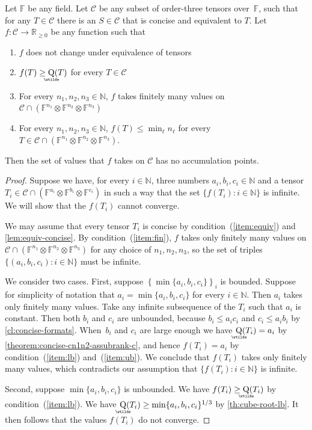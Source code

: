 \documentclass{daj}
\DeclareMathOperator{\asympsubrank}{\underaccent{\wtilde}{Q}}
\newcommand{\FF}{\mathbb{F}}
\newcommand{\RR}{\mathbb{R}}
\newcommand{\NN}{\mathbb{N}}
\begin{document}
\begin{theorem}
    \label{th:gen-no-acc}
    Let $\FF$ be any field. Let $\mathcal{C}$ be any subset of order-three tensors over~$\FF$, such that for any $T \in \mathcal{C}$ there is an $S \in \mathcal{C}$ that is concise and equivalent to $T$.
    Let~$f : \mathcal{C} \to \RR_{\geq0}$ be any function such that
    \begin{enumerate}[\upshape (i)]
    \item\label{item:equiv} $f$ does not change under equivalence of tensors
    \item\label{item:lb} $f(T) \geq \asympsubrank(T)$ for every $T \in \mathcal{C}$
    \item\label{item:fin} For every $n_1, n_2, n_3\in \NN$,  $f$ takes finitely many values on $\mathcal{C} \cap (\FF^{n_1} \otimes \FF^{n_2} \otimes \FF^{n_3})$ 
    \item\label{item:ub} For every $n_1, n_2, n_3\in \NN$, $f(T) \leq \min_\ell n_\ell$ for every $T \in \mathcal{C} \cap (\FF^{n_1} \otimes \FF^{n_2} \otimes \FF^{n_3})$.
    \end{enumerate}
    Then the set of values that $f$ takes on $\mathcal{C}$ has no accumulation points.
\end{theorem}

%

\begin{proof}
    Suppose we have, for every $i \in \NN$, three numbers $a_i, b_i, c_i \in \NN$ and a tensor
    $T_i \in \mathcal{C} \cap (\FF^{a_i} \otimes \FF^{b_i} \otimes \FF^{c_i})$ in such a way that the set $\{f(T_i): i \in \NN\}$ is infinite. We will show that the $f(T_i)$ cannot converge.
    
    We may assume that every tensor $T_i$ is concise by condition~(\ref{item:equiv}) and \autoref{lem:equiv-concise}.
    By condition~(\ref{item:fin}), $f$ takes only finitely many values on $\mathcal{C} \cap (\FF^{n_1} \otimes \FF^{n_2} \otimes \FF^{n_3})$ for any choice of $n_1, n_2, n_3$, so the set of triples $\{(a_i, b_i, c_i): i \in \NN\}$ must be infinite. %
    
    We consider two cases. First,  suppose $\left\{\min \{a_i, b_i, c_i\}\right\}_i$ is bounded. Suppose for simplicity of notation that $a_i = \min \{a_i, b_i, c_i\}$ for every $i \in \NN$. Then $a_i$ takes only finitely many values. Take any infinite subsequence of the $T_i$ such that  $a_i$ is constant. %
    Then both $b_i$ and $c_i$ are unbounded, because $b_i\leq a_i c_i$ and $c_i\leq a_i b_i$ by \autoref{cl:concise-formats}. When~$b_i$ and $c_i$ are large enough we have $\asympsubrank(T_i) = a_i$ by \autoref{theorem:concise-cn1n2-assubrank-c}, %
    and hence $f(T_i) = a_i$ by condition~(\ref{item:lb}) and~(\ref{item:ub}). We conclude that $f(T_i)$ takes only finitely many values, which contradicts our assumption that $\{f(T_i): i \in \NN\}$ is infinite.
    
    Second, suppose $\min \{a_i, b_i, c_i\}$ is unbounded. 
    We have $f(T_i) \geq \asympsubrank(T_i)$ by condition~(\ref{item:lb}). We have $\asympsubrank(T_i) \geq \min \{a_i, b_i, c_i\}^{1/3}$ by \autoref{th:cube-root-lb}. It then follows that the values $f(T_i)$ do not converge.
\end{proof}
\end{document}
